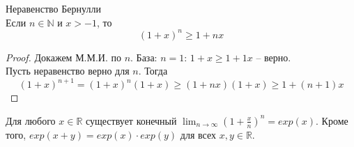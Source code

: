     \begin{lemma}{Неравенство Бернулли}
        \\
        Если $n \in \mathds{N}$ и $x > -1$, то
        \[(1 + x)^{n} \geq 1 + nx\]
    \end{lemma}
    
    \begin{proof}
        Докажем М.М.И. по $n$. База: $n = 1$: $1 + x \geq 1 + 1x$ -- верно.
        \\
        Пусть неравенство верно для $n$. Тогда
        \[(1+x)^{n+1} = (1+x)^{n}(1+x) \geq (1+nx)(1+x) \geq 1 + (n+1)x\]
    \end{proof}
    
    \begin{theorem}
        Для любого $x \in \mathds{R}$ существует конечный $\lim_{n \to \infty} (1 + \frac{x}{n})^{n} = exp (x)$. Кроме того, $exp(x + y) = exp(x) \cdot exp(y)$ для всех $x, y \in \mathds{R}$. 
    \end{theorem}
    
